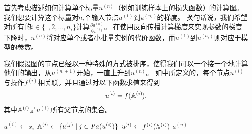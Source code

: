 首先考虑描述如何计算单个标量$u^{(n)}$（例如训练样本上的损失函数）的计算图。
我们想要计算这个标量对$n_i$个输入节点$u^{(1)}$到$u^{(n_i)}$的梯度。
换句话说，我们希望对所有的$i\in\{1,2,\ldots,n_i\}$计算$\frac{\partial u^{(n)}}{\partial u^{(i)}}$。
在使用反向传播计算梯度来实现参数的梯度下降时，$u^{(n)}$将对应单个或者小批量实例的代价函数，而$u^{(1)}$到$u^{(n_i)}$则对应于模型的参数。


我们假设图的节点已经以一种特殊的方式被排序，使得我们可以一个接一个地计算他们的输出，从$u^{(n_i+1)}$开始，一直上升到$u^{(n)}$。
如中所定义的，每个节点$u^{(i)}$与操作$f^{(i)}$相关联，并且通过对以下函数求值来得到
\begin{equation}
  u^{(i)} = f(\mathbb{A}^{(i)}),
\end{equation}
其中$\SetA^{(i)}$是$u^{(i)}$所有父节点的集合。
\begin{algorithm}[htbp]
\caption{计算将$n_i$个输入$u^{(1)}$到$u^{(n_i)}$映射到一个输出$u^{(n)}$的程序。
这定义了一个计算图，其中每个节点通过将函数$f^{(i)}$应用到变量集合$\SetA^{(i)}$上来计算$u^{(i)}$的值，$\SetA^{(i)}$包含先前节点$u^{(j)}$的值满足$j<i$且$j \in Pa(u^{(i)})$。
计算图的输入是向量$\Vx$，并且被分配给前$n_i$个节点$u^{(1)}$到$u^{(n_i)}$。计算图的输出可以从最后一个（输出）节点$u^{(n)}$读出。}
\label{alg:fprop}
\begin{algorithmic}
 \STATE $u^{(i)} \leftarrow x_i$
\ENDFOR
{}
 \STATE $\mathbb{A}^{(i)} \leftarrow \{ u^{(j)} \mid j \in Pa(u^{(i)}) \}$
 \STATE $u^{(i)} \leftarrow f^{(i)}(\mathbb{A}^{(i)})$
\ENDFOR
{} $u^{(n)}$
\end{algorithmic}
\end{algorithm}


